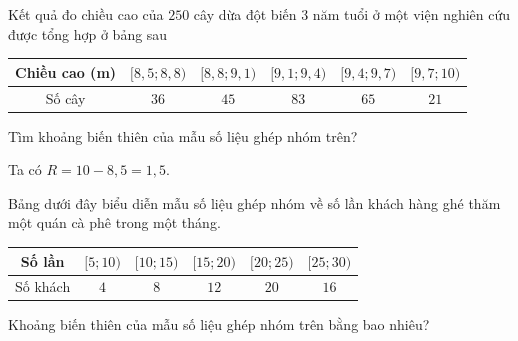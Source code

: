 \begin{bt}%
	Kết quả đo chiều cao của $250$ cây dừa đột biến $3$ năm tuổi ở một viện nghiên cứu được tổng hợp ở bảng sau
	\begin{center}
		\begin{tabular}{|c|c|c|c|c|c|}
			\hline
			Chiều cao (m) & $[8{,}5;8{,}8)$ & $[8{,}8;9{,}1)$ & $[9{,}1;9{,}4)$ & $[9{,}4;9{,}7)$ & $[9{,}7;10)$ \\
			\hline
			Số cây & $36$ & $45$ & $83$ & $65$ & $21$ \\
			\hline
		\end{tabular}	
	\end{center}
	Tìm khoảng biến thiên của mẫu số liệu ghép nhóm trên?
	
	\loigiai
	{
		Ta có $R=10-8{,}5=1{,}5$.
	}
\end{bt}

\begin{bt}%

	Bảng dưới đây biểu diễn mẫu số liệu ghép nhóm về số lần khách hàng ghé thăm một quán cà phê trong một tháng.
	\begin{center}
		\begin{tabular}{|c|c|c|c|c|c|}
			\hline Số lần & $[5 ; 10)$ & $[10 ; 15)$ & $[15 ; 20)$ & $[20 ; 25)$ & $[25 ; 30)$ \\
			\hline Số khách & $4$ & $8$ & $12$ & $20$ & $16$ \\
			\hline
		\end{tabular}
	\end{center}
	Khoảng biến thiên của mẫu số liệu ghép nhóm trên bằng bao nhiêu?
\end{bt}

